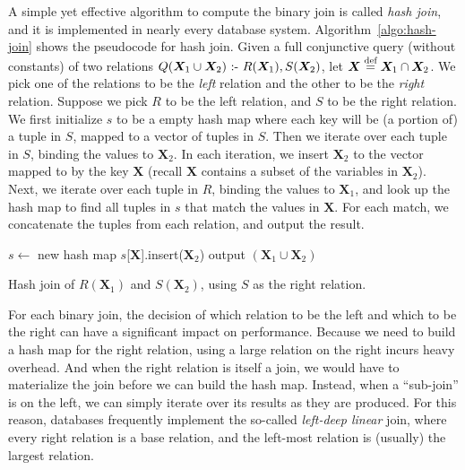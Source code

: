 A simple yet effective algorithm to compute the binary join is called {\em hash join},
 and it is implemented in nearly every database system.
Algorithm~\ref{algo:hash-join} shows the pseudocode for hash join.
Given a full conjunctive query (without constants) 
 of two relations $Q({\bm X_1} \cup {\bm X_2}) \text{ :- } R({\bm X_1}), S({\bm X_2})$,
 let ${\bm X} \stackrel{\text{def}}{=} {\bm X_1} \cap {\bm X_2}$.
We pick one of the relations to be the {\em left} relation and the other to be the {\em right} relation.
Suppose we pick $R$ to be the left relation, and $S$ to be the right relation.
We first initialize $s$ to be a empty hash map
 where each key will be (a portion of) a tuple in $S$,
 mapped to a vector of tuples in $S$.
Then we iterate over each tuple in $S$, 
 binding the values to ${\bm X_2}$.
In each iteration,
 we insert ${\bm X_2}$ to the vector mapped to by the key ${\bm X}$ (recall ${\bm X}$ contains a subset of the variables in ${\bm X_2}$).
Next, we iterate over each tuple in $R$,
 binding the values to ${\bm X_1}$,
 and look up the hash map to find all tuples in $s$ that match the values in ${\bm X}$.
For each match, we concatenate the tuples from each relation,
 and output the result.
%
\begin{algorithm}[th]
    $s \gets$ new hash map\;
    {
        $s$[${\bm X}$].insert(${\bm X_2}$)\;
    }
    {
        {
            output $({\bm X_1}\cup {\bm X_2})$\;
        }
    }
    \caption{Hash join of $R({\bm X_1})$ and $S({\bm X_2})$, using $S$ as the right relation.}
    \label{algo:hash-join}
\end{algorithm}

For each binary join, the decision of which relation to be the left and which to be the right
 can have a significant impact on performance.
Because we need to build a hash map for the right relation,
 using a large relation on the right incurs heavy overhead.
And when the right relation is itself a join,
 we would have to materialize the join before we can build the hash map.
Instead, when a ``sub-join'' is on the left, 
 we can simply iterate over its results as they are produced.
For this reason, databases frequently implement the so-called 
 {\em left-deep linear} join, 
 where every right relation is a base relation,
 and the left-most relation is (usually) the largest relation.


